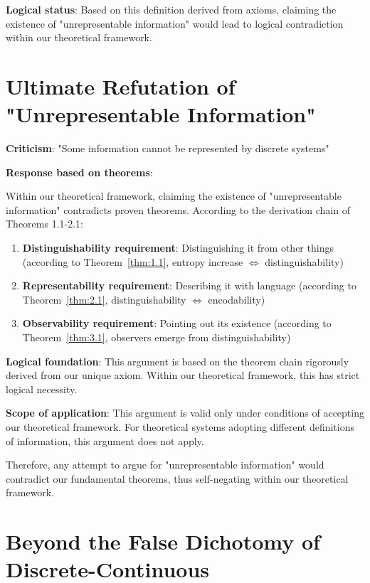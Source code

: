 \textbf{Logical status}: Based on this definition derived from axioms, claiming the existence of "unrepresentable information" would lead to logical contradiction within our theoretical framework.

\section{Ultimate Refutation of "Unrepresentable Information"}
\label{sec:ch09_defense:ultimate-refutation-of-unrepresentable-information}

\textbf{Criticism}: "Some information cannot be represented by discrete systems"

\textbf{Response based on theorems}:

Within our theoretical framework, claiming the existence of "unrepresentable information" contradicts proven theorems. According to the derivation chain of Theorems 1.1-2.1:

\begin{enumerate}
\item \textbf{Distinguishability requirement}: Distinguishing it from other things (according to Theorem~\ref{thm:1.1}, entropy increase $\Leftrightarrow$ distinguishability)
\item \textbf{Representability requirement}: Describing it with language (according to Theorem~\ref{thm:2.1}, distinguishability $\Leftrightarrow$ encodability)
\item \textbf{Observability requirement}: Pointing out its existence (according to Theorem~\ref{thm:3.1}, observers emerge from distinguishability)
\end{enumerate}

\textbf{Logical foundation}: This argument is based on the theorem chain rigorously derived from our unique axiom. Within our theoretical framework, this has strict logical necessity.

\textbf{Scope of application}: This argument is valid only under conditions of accepting our theoretical framework. For theoretical systems adopting different definitions of information, this argument does not apply.

Therefore, any attempt to argue for "unrepresentable information" would contradict our fundamental theorems, thus self-negating within our theoretical framework.

\section{Beyond the False Dichotomy of Discrete-Continuous}
\label{sec:ch09_defense:beyond-the-false-dichotomy-of-discrete-continuous}

